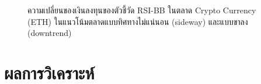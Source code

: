 \begin{figure}[!htb]
    \centering
    \caption{ความเปลี่ยนของเงินลงทุนของตัวชี้วัด RSI-BB ในตลาด Crypto Currency (ETH) ในแนวโน้มตลาดแบบทิศทางไม่แน่นอน (sideway) และแบบขาลง (downtrend)}
\end{figure}
\FloatBarrier

\section{ผลการวิเคราะห์}
